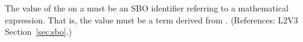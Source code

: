 The value of the   on a \Delay must be an SBO
identifier referring to a mathematical expression.  That is, the value
must be a term derived from \sbomathformula.  (References: 
L2V3 Section~\ref{sec:sbo}.)
